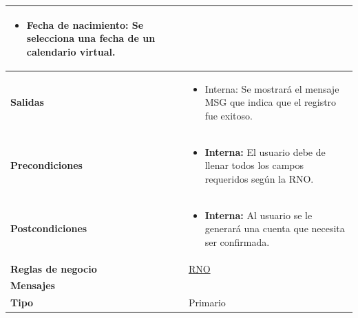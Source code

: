 \begin{center}
\begin{longtable}{| p{3.5cm} | p{11.5cm} |}
\begin{itemize}
              \item \textbf{Fecha de nacimiento}: Se selecciona una fecha de un calendario virtual.
            \end{itemize} \\
        \hline	
          \textbf{Salidas} &  
          \begin{itemize}
              \item Interna: Se mostrará el mensaje MSG que indica que el registro fue exitoso.
            \end{itemize} \\
        \hline	
          \textbf{Precondiciones}& 
            \begin{itemize}
              \item \textbf{Interna:} El usuario debe de llenar todos los campos requeridos según la RNO.
            \end{itemize} \\
        \hline	
          \textbf{Postcondiciones} & 
            \begin{itemize}
              \item \textbf{Interna:} Al usuario se le generará una cuenta que necesita ser confirmada.
            \end{itemize} \\
        \hline    
           \textbf{Reglas de negocio} & \hyperref[]{RNO}\\
        \hline
           \textbf{Mensajes} & \\
        \hline
           \textbf{Tipo} & Primario \\
        \hline	    
  \end{longtable}
\end{center}
\endgroup

